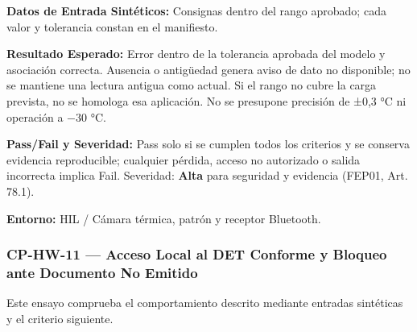 \par\noindent\textbf{Datos de Entrada Sintéticos:} Consignas dentro del rango aprobado; cada valor y tolerancia constan en el manifiesto.\par
\par\noindent\textbf{Resultado Esperado:} Error dentro de la tolerancia aprobada del modelo y asociación correcta. Ausencia o antigüedad genera aviso de dato no disponible; no se mantiene una lectura antigua como actual. Si el rango no cubre la carga prevista, no se homologa esa aplicación. No se presupone precisión de ±0,3 °C ni operación a −30 °C.\par
\par\noindent\textbf{Pass/Fail y Severidad:} Pass solo si se cumplen todos los criterios y se conserva evidencia reproducible; cualquier pérdida, acceso no autorizado o salida incorrecta implica Fail. Severidad: \textbf{Alta} para seguridad y evidencia (FEP01, Art. 78.1).\par
\par\noindent\textbf{Entorno:} HIL / Cámara térmica, patrón y receptor Bluetooth.\par


\subsubsection*{CP-HW-11 — Acceso Local al DET Conforme y Bloqueo ante Documento No Emitido}\label{sec:9-cp-hw-11}
Este ensayo comprueba el comportamiento descrito mediante entradas sintéticas y el criterio siguiente.

